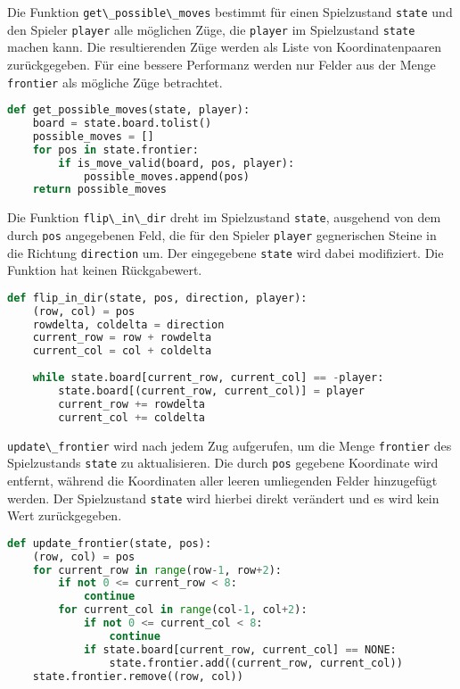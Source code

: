 Die Funktion \passthrough{\lstinline!get\_possible\_moves!} bestimmt für
einen Spielzustand \passthrough{\lstinline!state!} und den Spieler
\passthrough{\lstinline!player!} alle möglichen Züge, die
\passthrough{\lstinline!player!} im Spielzustand
\passthrough{\lstinline!state!} machen kann. Die resultierenden Züge
werden als Liste von Koordinatenpaaren zurückgegeben. Für eine bessere
Performanz werden nur Felder aus der Menge
\passthrough{\lstinline!frontier!} als mögliche Züge betrachtet.

\begin{lstlisting}[language=Python]
def get_possible_moves(state, player):
    board = state.board.tolist()
    possible_moves = []
    for pos in state.frontier:
        if is_move_valid(board, pos, player):
            possible_moves.append(pos)
    return possible_moves
\end{lstlisting}

Die Funktion \passthrough{\lstinline!flip\_in\_dir!} dreht im
Spielzustand \passthrough{\lstinline!state!}, ausgehend von dem durch
\passthrough{\lstinline!pos!} angegebenen Feld, die für den Spieler
\passthrough{\lstinline!player!} gegnerischen Steine in die Richtung
\passthrough{\lstinline!direction!} um. Der eingegebene
\passthrough{\lstinline!state!} wird dabei modifiziert. Die Funktion hat
keinen Rückgabewert.

\begin{lstlisting}[language=Python]
def flip_in_dir(state, pos, direction, player):
    (row, col) = pos
    rowdelta, coldelta = direction
    current_row = row + rowdelta
    current_col = col + coldelta
    
    while state.board[current_row, current_col] == -player:
        state.board[(current_row, current_col)] = player
        current_row += rowdelta
        current_col += coldelta
\end{lstlisting}

\passthrough{\lstinline!update\_frontier!} wird nach jedem Zug
aufgerufen, um die Menge \passthrough{\lstinline!frontier!} des
Spielzustands \passthrough{\lstinline!state!} zu aktualisieren. Die
durch \passthrough{\lstinline!pos!} gegebene Koordinate wird entfernt,
während die Koordinaten aller leeren umliegenden Felder hinzugefügt
werden. Der Spielzustand \passthrough{\lstinline!state!} wird hierbei
direkt verändert und es wird kein Wert zurückgegeben.

\begin{lstlisting}[language=Python]
def update_frontier(state, pos):
    (row, col) = pos
    for current_row in range(row-1, row+2):
        if not 0 <= current_row < 8:
            continue
        for current_col in range(col-1, col+2):
            if not 0 <= current_col < 8:
                continue
            if state.board[current_row, current_col] == NONE:
                state.frontier.add((current_row, current_col))
    state.frontier.remove((row, col))
\end{lstlisting}

